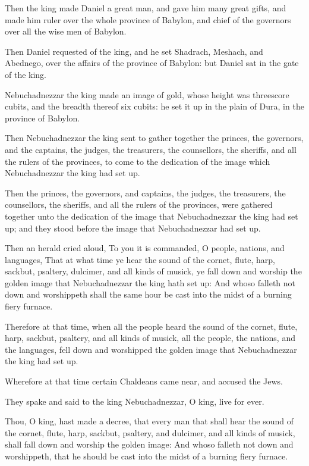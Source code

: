 \Verse Then the king made Daniel a great man, and gave him many great gifts, and made him ruler over the whole province of Babylon, and chief of the governors over all the wise men of Babylon.

\Verse Then Daniel requested of the king, and he set Shadrach, Meshach, and Abednego, over the affairs of the province of Babylon: but Daniel sat in the gate of the king.


\Chapter
\Verse Nebuchadnezzar the king made an image of gold, whose height was threescore cubits, and the breadth thereof six cubits: he set it up in the plain of Dura, in the province of Babylon.

\Verse Then Nebuchadnezzar the king sent to gather together the princes, the governors, and the captains, the judges, the treasurers, the counsellors, the sheriffs, and all the rulers of the provinces, to come to the dedication of the image which Nebuchadnezzar the king had set up.

\Verse Then the princes, the governors, and captains, the judges, the treasurers, the counsellors, the sheriffs, and all the rulers of the provinces, were gathered together unto the dedication of the image that Nebuchadnezzar the king had set up; and they stood before the image that Nebuchadnezzar had set up.

\Verse Then an herald cried aloud, To you it is commanded, O people, nations, and languages, \Verse That at what time ye hear the sound of the cornet, flute, harp, sackbut, psaltery, dulcimer, and all kinds of musick, ye fall down and worship the golden image that Nebuchadnezzar the king hath set up: \Verse And whoso falleth not down and worshippeth shall the same hour be cast into the midst of a burning fiery furnace.

\Verse Therefore at that time, when all the people heard the sound of the cornet, flute, harp, sackbut, psaltery, and all kinds of musick, all the people, the nations, and the languages, fell down and worshipped the golden image that Nebuchadnezzar the king had set up.

\Verse Wherefore at that time certain Chaldeans came near, and accused the Jews.

\Verse They spake and said to the king Nebuchadnezzar, O king, live for ever.

\Verse Thou, O king, hast made a decree, that every man that shall hear the sound of the cornet, flute, harp, sackbut, psaltery, and dulcimer, and all kinds of musick, shall fall down and worship the golden image: \Verse And whoso falleth not down and worshippeth, that he should be cast into the midst of a burning fiery furnace.

